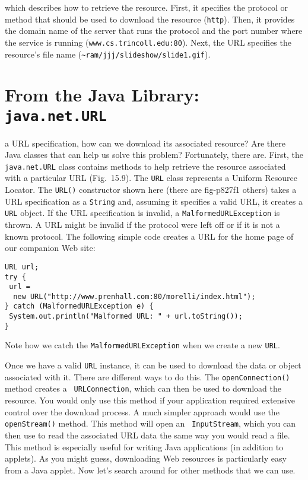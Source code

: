 \noindent which describes how to retrieve the resource.   First, it
specifies the protocol or method that should be used to download the
resource ({\tt http}). Then, it provides the domain name of the server
that runs the protocol and the port number where the service is
running ({\tt www.cs.trincoll.edu:80}).  Next, the URL specifies the
resource's file name ({\tt \verb|~|ram/jjj/slideshow/slide1.gif}).

\section{From the Java Library: {\tt java.net.URL}}



 a URL specification, how can we download its associated
resource?  Are there Java classes that can help us solve this problem?
Fortunately, there are.  First, the {\tt java.net.URL} class contains
methods to help retrieve the resource associated with a particular URL
(Fig.~15.9).  The {\tt URL} class represents a Uniform
Resource Locator.  The {\tt URL()} constructor shown here (there are
{fig-p827f1}
others) takes a URL specification as a {\tt String} and, assuming it
specifies a valid URL, it creates a {\tt URL} object.  If the URL
\WWWjava
specification is invalid, a {\tt MalformedURLException} is thrown.  A
URL might be invalid if the protocol were left off or if it is not a
known protocol.  The following simple code creates a URL for the home
page of our companion Web site:

\begin{jjjlisting}
\begin{lstlisting}
URL url;
try {
 url = 
  new URL("http://www.prenhall.com:80/morelli/index.html");
} catch (MalformedURLException e) {
 System.out.println("Malformed URL: " + url.toString());
}
\end{lstlisting}
\end{jjjlisting}

\noindent Note how we catch the {\tt MalformedURLException}
when we create a new {\tt URL}.

Once we have a valid {\tt URL} instance, it can be used to download
the data or object associated with it.  There are different ways to do
this.  The {\tt openConnection()} method creates a {\tt
URLConnection}, which can then be used to download the resource.  You
would only use this method if your application required extensive
control over the download process.  A much simpler approach would use
the {\tt openStream()} method.  This method will open an {\tt
InputStream}, which you can then use to read the associated URL data
the same way you would read a file.  This method is especially useful
for writing Java applications (in addition to applets).  As you might
guess, downloading Web resources is particularly easy from a Java
applet.  Now let's search around for other methods that we can use.


